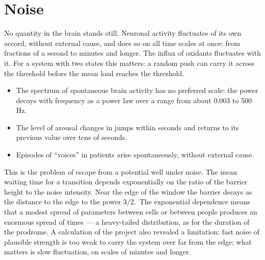 \section{Noise}
No quantity in the brain stands still. Neuronal activity fluctuates of its own accord, without external cause, and does so on all time scales at once: from fractions of a second to minutes and longer. The influx of oxidants fluctuates with it. For a system with two states this matters: a random push can carry it across the threshold before the mean load reaches the threshold.
\facts
\begin{itemize}
\item The spectrum of spontaneous brain activity has no preferred scale: the power decays with frequency as a power law over a range from about 0.003 to 500\,Hz.\tS
\item The level of arousal changes in jumps within seconds and returns to its previous value over tens of seconds.\tS
\item Episodes of ``voices'' in patients arise spontaneously, without external cause.\tS
\end{itemize}
\begin{ineq}
This is the problem of escape from a potential well under noise. The mean waiting time for a transition depends exponentially on the ratio of the barrier height to the noise intensity. Near the edge of the window the barrier decays as the distance to the edge to the power $3/2$.\tD\ The exponential dependence means that a modest spread of parameters between cells or between people produces an enormous spread of times --- a heavy-tailed distribution, as for the duration of the prodrome. A calculation of the project also revealed a limitation: fast noise of plausible strength is too weak to carry the system over far from the edge; what matters is slow fluctuation, on scales of minutes and longer.\tD
\end{ineq}
